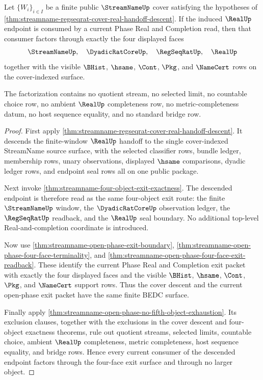 \begin{theorem}
\label{thm:streamname-regseqrat-cover-real-four-face-exit-descent}
Let $\{W_i\}_{i\in I}$ be a finite public $\StreamNameUp$ cover satisfying the
hypotheses of
\autoref{thm:streamname-regseqrat-cover-real-handoff-descent}. If the induced
$\RealUp$ endpoint is consumed by a current Phase Real and Completion read,
then that consumer factors through exactly the four displayed faces
$$
\StreamNameUp,\quad \DyadicRatCoreUp,\quad \RegSeqRatUp,\quad \RealUp
$$
together with the visible $\BHist$, $\hsame$, $\Cont$, $\Pkg$, and $\NameCert$
rows on the cover-indexed surface.

The factorization contains no quotient stream, no selected limit, no countable
choice row, no ambient $\RealUp$ completeness row, no metric-completeness datum,
no host sequence equality, and no standard bridge row.
\end{theorem}
\begin{proof}
First apply
\autoref{thm:streamname-regseqrat-cover-real-handoff-descent}. It descends the
finite-window $\RealUp$ handoff to the single cover-indexed StreamName source
surface, with the selected classifier rows, bundle ledger, membership rows,
unary observations, displayed $\hsame$ comparisons, dyadic ledger rows, and
endpoint seal rows all on one public package.

Next invoke \autoref{thm:streamname-four-object-exit-exactness}. The descended
endpoint is therefore read as the same four-object exit route: the finite
$\StreamNameUp$ window, the $\DyadicRatCoreUp$ observation ledger, the
$\RegSeqRatUp$ readback, and the $\RealUp$ seal boundary. No additional
top-level Real-and-completion coordinate is introduced.

Now use \autoref{thm:streamname-open-phase-exit-boundary},
\autoref{thm:streamname-open-phase-four-face-terminality}, and
\autoref{thm:streamname-open-phase-four-face-exit-readback}. These identify the
current Phase Real and Completion exit packet with exactly the four displayed
faces and the visible $\BHist$, $\hsame$, $\Cont$, $\Pkg$, and $\NameCert$
support rows. Thus the cover descent and the current open-phase exit packet
have the same finite BEDC surface.

Finally apply
\autoref{thm:streamname-open-phase-no-fifth-object-exhaustion}. Its exclusion
clauses, together with the exclusions in the cover descent and four-object
exactness theorems, rule out quotient streams, selected limits, countable
choice, ambient $\RealUp$ completeness, metric completeness, host sequence
equality, and bridge rows. Hence every current consumer of the descended
endpoint factors through the four-face exit surface and through no larger
object.
\end{proof}



